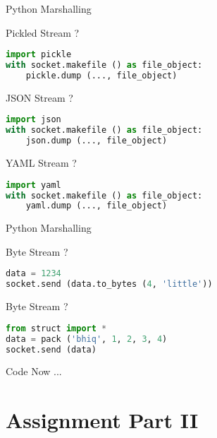 \begin{frame}[fragile]{Python Marshalling}
    \begin{block}{Pickled Stream ?}
\begin{lstlisting}[language=python,style=mini]
import pickle
with socket.makefile () as file_object:
    pickle.dump (..., file_object)
\end{lstlisting}
    \end{block}
    \begin{block}{JSON Stream ?}
\begin{lstlisting}[language=python,style=mini]
import json
with socket.makefile () as file_object:
    json.dump (..., file_object)
\end{lstlisting}
    \end{block}
    \begin{block}{YAML Stream ?}
\begin{lstlisting}[language=python,style=mini]
import yaml
with socket.makefile () as file_object:
    yaml.dump (..., file_object)
\end{lstlisting}
    \end{block}
\end{frame}


\begin{frame}[fragile]{Python Marshalling}
    \begin{block}{Byte Stream ?}
\begin{lstlisting}[language=python,style=mini]
data = 1234
socket.send (data.to_bytes (4, 'little'))
\end{lstlisting}
    \end{block}
    \begin{block}{Byte Stream ?}
\begin{lstlisting}[language=python,style=mini]
from struct import *
data = pack ('bhiq', 1, 2, 3, 4)
socket.send (data)
\end{lstlisting}
    \end{block}
\end{frame}


\begin{frame}{Code Now ...}
\end{frame}


\section{Assignment Part II}


